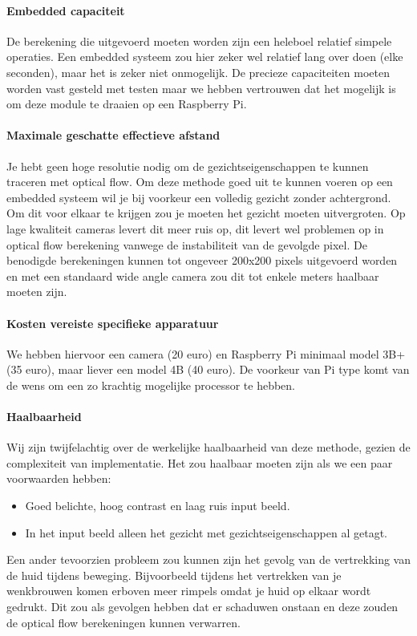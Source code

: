 \documentclass[11pt]{article}
\begin{document}
    \paragraph{Embedded capaciteit}
    De berekening die uitgevoerd moeten worden zijn een heleboel relatief simpele operaties.
    Een embedded systeem zou hier zeker wel relatief lang over doen (elke seconden), maar het is zeker niet onmogelijk.
    De precieze capaciteiten moeten worden vast gesteld met testen maar we hebben vertrouwen dat het mogelijk is om deze module te draaien op een Raspberry Pi.

    \paragraph{Maximale geschatte effectieve afstand}
    Je hebt geen hoge resolutie nodig om de gezichtseigenschappen te kunnen traceren met optical flow.
    Om deze methode goed uit te kunnen voeren op een embedded systeem wil je bij voorkeur een volledig gezicht zonder achtergrond.
    Om dit voor elkaar te krijgen zou je moeten het gezicht moeten uitvergroten.
    Op lage kwaliteit cameras levert dit meer ruis op, dit levert wel problemen op in optical flow berekening vanwege de instabiliteit van de gevolgde pixel.
    De benodigde berekeningen kunnen tot ongeveer 200x200 pixels uitgevoerd worden en met een standaard wide angle camera zou dit tot enkele meters haalbaar moeten zijn.

    \paragraph{Kosten vereiste specifieke apparatuur}
    We hebben hiervoor een camera (20 euro) en Raspberry Pi minimaal model 3B+ (35 euro), maar liever een model 4B (40 euro). 
    De voorkeur van Pi type komt van de wens om een zo krachtig mogelijke processor te hebben. 

    \paragraph{Haalbaarheid}
    Wij zijn twijfelachtig over de werkelijke haalbaarheid van deze methode, gezien de complexiteit van implementatie.
    Het zou haalbaar moeten zijn als we een paar voorwaarden hebben:
    \begin{itemize}
        \item Goed belichte, hoog contrast en laag ruis input beeld.
        \item In het input beeld alleen het gezicht met gezichtseigenschappen al getagt.
    \end{itemize}
    Een ander tevoorzien probleem zou kunnen zijn het gevolg van de vertrekking van de huid tijdens beweging. 
    Bijvoorbeeld tijdens het vertrekken van je wenkbrouwen komen erboven meer rimpels omdat je huid op elkaar wordt gedrukt. 
    Dit zou als gevolgen hebben dat er schaduwen onstaan en deze zouden de optical flow berekeningen kunnen verwarren. 
\end{document}
